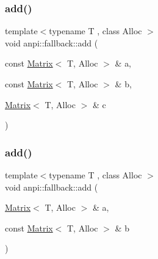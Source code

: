 \subsubsection{\texorpdfstring{add()}{add()}\hspace{0.1cm}{\footnotesize\ttfamily [1/2]}}
{\footnotesize\ttfamily template$<$typename T , class Alloc $>$ \\
void anpi\+::fallback\+::add (\begin{DoxyParamCaption}\item[{const \hyperlink{classanpi_1_1Matrix}{Matrix}$<$ T, Alloc $>$ \&}]{a,  }\item[{const \hyperlink{classanpi_1_1Matrix}{Matrix}$<$ T, Alloc $>$ \&}]{b,  }\item[{\hyperlink{classanpi_1_1Matrix}{Matrix}$<$ T, Alloc $>$ \&}]{c }\end{DoxyParamCaption})\hspace{0.3cm}{\ttfamily [inline]}}

\mbox{\label{namespaceanpi_1_1fallback_a7618281e2e5eff8773323b9815f974ab}} 
\subsubsection{\texorpdfstring{add()}{add()}\hspace{0.1cm}{\footnotesize\ttfamily [2/2]}}
{\footnotesize\ttfamily template$<$typename T , class Alloc $>$ \\
void anpi\+::fallback\+::add (\begin{DoxyParamCaption}\item[{\hyperlink{classanpi_1_1Matrix}{Matrix}$<$ T, Alloc $>$ \&}]{a,  }\item[{const \hyperlink{classanpi_1_1Matrix}{Matrix}$<$ T, Alloc $>$ \&}]{b }\end{DoxyParamCaption})\hspace{0.3cm}{\ttfamily [inline]}}

\mbox{\label{namespaceanpi_1_1fallback_a5edefd65be498d783018b1a7a8bf48b0}} 
